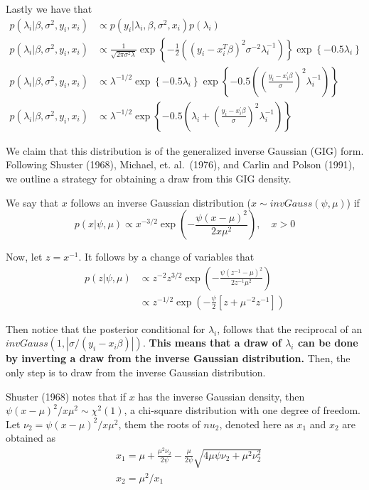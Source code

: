 \documentclass[
]{article}
\begin{document}
Lastly we have that \begin{align}
p\left(\lambda_{i} | \beta, \sigma^{2}, y_{i}, x_{i}\right) &\propto p\left( y_{i}| \lambda_{i}, \beta, \sigma^{2}, x_{i}\right) p(\lambda_{i}) \\
p\left(\lambda_{i} | \beta, \sigma^{2}, y_{i}, x_{i}\right) &\propto \frac{1}{\sqrt{2\pi \sigma^2 \lambda} }\exp \left\{-\frac{1}{2}\left(\left(y_{i}-x_{i}^{T} \beta\right)^{2} \sigma^{-2}\lambda_{i}^{-1}\right)\right\} \exp \left\{-0.5 \lambda_{i}\right\} \\
p\left(\lambda_{i} | \beta, \sigma^{2}, y_{i}, x_{i}\right) &\propto \lambda^{-1 / 2} \exp \left\{-0.5 \lambda_{i}\right\} 
\exp \left\{-0.5\left(\left(\frac{y_{i}-x_{i}^{\prime} \beta}{\sigma}\right)^{2} \lambda_{i}^{-1}\right)\right\} \\
p\left(\lambda_{i} | \beta, \sigma^{2}, y_{i}, x_{i}\right) &\propto \lambda^{-1 / 2} \exp \left\{-0.5\left(\lambda_{i}+\left(\frac{y_{i}-x_{i}^{\prime} \beta}{\sigma}\right)^{2} \lambda_{i}^{-1}\right)\right\}
\end{align}

We claim that this distribution is of the generalized inverse Gaussian
(GIG) form. Following Shuster (1968), Michael, et. al.~(1976), and
Carlin and Polson (1991), we outline a strategy for obtaining a draw
from this GIG density.

We say that \(x\) follows an inverse Gaussian distribution
(\(x \sim invGauss(\psi, \mu)\)) if \begin{equation}
p(x | \psi, \mu) \propto x^{-3 / 2} \exp \left(-\frac{\psi(x-\mu)^{2}}{2 x \mu^{2}}\right), \quad x>0
\end{equation}

Now, let \(z = x^{−1}\). It follows by a change of variables that
\begin{align}
p(z | \psi, \mu) &\propto z^{-2} z^{3 / 2} \exp \left(-\frac{\psi\left(z^{-1}-\mu\right)^{2}}{2 z^{-1} \mu^{2}}\right) \\
& \propto z^{-1 / 2} \exp \left(-\frac{\psi}{2}\left[z+\mu^{-2} z^{-1}\right]\right)
\end{align}

Then notice that the posterior conditional for \(\lambda_i\), follows
that the reciprocal of an \(invGauss(1, |\sigma/(y_i - x_i\beta)|)\).
\textbf{This means that a draw of \(\lambda_i\) can be done by inverting
a draw from the inverse Gaussian distribution.} Then, the only step is
to draw from the inverse Gaussian distribution.

Shuster (1968) notes that if \(x\) has the inverse Gaussian density,
then \(\psi(x − \mu)^2/x\mu^2 \sim \chi^2(1)\), a chi-square
distribution with one degree of freedom. Let
\(\nu_2 = \psi(x − \mu)^2/x\mu^2\), them the roots of \(nu_2\), denoted
here as \(x_1\) and \(x_2\) are obtained as \begin{align}
&x_{1}=\mu+\frac{\mu^{2} \nu_{2}}{2 \psi}-\frac{\mu}{2 \psi} \sqrt{4 \mu \psi \nu_{2}+\mu^{2} \nu_{2}^{2}}\\
&x_{2}=\mu^{2} / x_{1}
\end{align}
\end{document}
